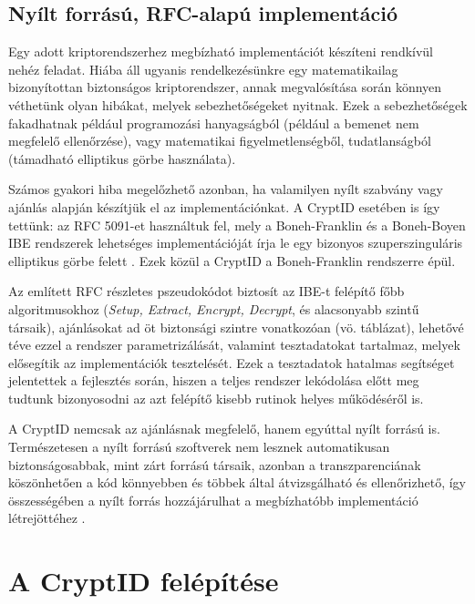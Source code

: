 \subsection{Nyílt forrású, RFC-alapú implementáció}

Egy adott kriptorendszerhez megbízható implementációt készíteni rendkívül nehéz feladat. Hiába áll ugyanis rendelkezésünkre egy matematikailag bizonyítottan biztonságos kriptorendszer, annak megvalósítása során könnyen véthetünk olyan hibákat, melyek sebezhetőségeket nyitnak. Ezek a sebezhetőségek fakadhatnak például programozási hanyagságból (például a bemenet nem megfelelő ellenőrzése), vagy matematikai figyelmetlenségből, tudatlanságból (támadható elliptikus görbe használata).

Számos gyakori hiba megelőzhető azonban, ha valamilyen nyílt szabvány vagy ajánlás alapján készítjük el az implementációnkat. A CryptID esetében is így tettünk: az RFC 5091-et használtuk fel, mely a Boneh-Franklin és a Boneh-Boyen IBE rendszerek lehetséges implementációját írja le egy bizonyos szuperszinguláris elliptikus görbe felett \cite{RFC5091}. Ezek közül a CryptID a Boneh-Franklin rendszerre épül.

Az említett RFC részletes pszeudokódot biztosít az IBE-t felépítő főbb algoritmusokhoz (\textit{Setup, Extract, Encrypt, Decrypt}, és alacsonyabb szintű társaik), ajánlásokat ad öt biztonsági szintre vonatkozóan (vö.  táblázat), lehetővé téve ezzel a rendszer parametrizálását, valamint tesztadatokat tartalmaz, melyek elősegítik az implementációk tesztelését. Ezek a tesztadatok hatalmas segítséget jelentettek a fejlesztés során, hiszen a teljes rendszer lekódolása előtt meg tudtunk bizonyosodni az azt felépítő kisebb rutinok helyes működéséről is.

A CryptID nemcsak az ajánlásnak megfelelő, hanem egyúttal nyílt forrású is. Természetesen a nyílt forrású szoftverek nem lesznek automatikusan biztonságosabbak, mint zárt forrású társaik, azonban a transzparenciának köszönhetően a kód könnyebben és többek által átvizsgálható és ellenőrizhető, így összességében a nyílt forrás hozzájárulhat a megbízhatóbb implementáció létrejöttéhez \cite{Wheeler::SecureProgrammingForLinuxAndUnixHOWTO}.

\pagebreak


\section{A CryptID felépítése}

